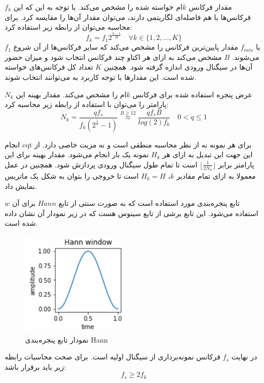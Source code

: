 $f_k$ مقدار فرکانس $k$ام خواسته شده را مشخص می‌کند. با توجه به این که این
فرکانس‌ها با هم فاصله‌ای لگاریتمی دارند، می‌توان مقدار آن‌ها را مقایسه کرد. برای
محاسبه می‌توان از رابطه زیر استفاده کرد:
\begin{equation}
    f_k = f_1 2^{\frac{k-1}{B}} \quad \forall k \in \{1, 2, ..., K\}
\end{equation}
$f_1$ یا $f_{min}$ مقدار پایین‌ترین فرکانس را مشخص می‌کند که سایر فرکانس‌ها از
آن شروع می‌شوند. $B$ مشخص می‌کند به ازای هر اکتاو چند فرکانس انتخاب شود و میزان
حضور آن‌ها در سیگنال ورودی اندازه گرفته شود. همچنین $K$ تعداد کل فرکانس‌های
خواسته شده است. این مقدارها با توجه کاربرد به می‌توانند انتخاب شوند.

$N_k$ عرض پنجره استفاده شده برای فرکانس $k$ام را مشخص می‌کند. مقدار بهینه این
پارامتر را می‌توان با استفاده از رابطه زیر محاسبه کرد:
\begin{equation}
    N_k = \frac{qf_s}{f_k(2^{\frac{1}{b}}-1)} \stackrel{B \geq 12}{\approx} \frac{qf_sB}{log(2)f_k} \quad 0 < q \leq 1
\end{equation}

انجام \gls{cqt} برای هر نمونه نه از نظر محاسبه منطقی است و نه مزیت خاصی دارد. از
این جهت این تبدیل به ازای هر $H_k$ نمونه یک بار انجام می‌شود. مقدار بهینه برای
این پارامتر برابر $\lfloor \frac{1}{2N_k} \rfloor$ است تا تمام طول سیگنال ورودی
پردازش شود. همچنین در عمل معمولا به ازای تمام مقادیر $k$، $H_k = H$ است تا خروجی
را بتوان به شکل یک ماتریس نمایش داد.

$w$ تابع پنجره‌بندی مورد استفاده است که به صورت سنتی از تابع $Hann$ برای آن
استفاده می‌شود. این تابع برشی از تابع سینوس‌ هست که در زیر نمودار آن نشان داده شده
است.
\begin{figure}[ht]
    \centering
    \includegraphics[height=5cm]{./statics/hann_plot.png}
    \caption{نمودار تابع پنجره‌بندی Hann}
\end{figure}

در نهایت $f_s$ فرکانس نمونه‌برداری از سیگنال اولیه است. برای صحت محاسبات رابطه
زیر باید برقرار باشد:
\begin{equation}
    f_s \geq 2f_k
\end{equation}

